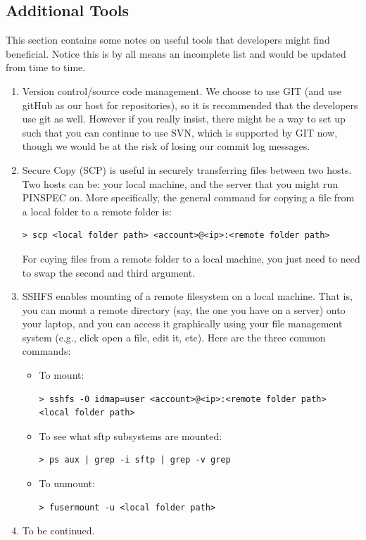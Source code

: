 \documentclass[titlepage]{article}
\begin{document}
\subsection{Additional Tools}
This section contains some notes on useful tools that developers might find beneficial. Notice this is by all means an incomplete list and would be updated from time to time. 
\begin{enumerate}
\item Version control/source code management. We choose to use GIT (and use gitHub as our host for repositories), so it is recommended that the developers use git as well. However if you really insist, there might be a way to set up such that you can continue to use SVN, which is supported by GIT now, though we would be at the risk of losing our commit log messages. 


\item Secure Copy (SCP) is useful in securely transferring files between two hosts. Two hosts can be: your local machine, and the server that you might run PINSPEC on. More specifically, the general command for copying a file from a local folder to a remote folder is: 
\begin{verbatim}
> scp <local folder path> <account>@<ip>:<remote folder path>
\end{verbatim}
For coying files from a remote folder to a local machine, you just need to need to swap the second and third argument. 

\item SSHFS enables mounting of a remote filesystem on a local machine. That is,  you can mount a remote directory (say, the one you have on a server) onto your laptop, and you can access it graphically using your file management system (e.g., click open a file, edit it, etc). Here are the three common commands:
\begin{itemize}
\item To mount: 
\begin{verbatim}
> sshfs -0 idmap=user <account>@<ip>:<remote folder path> <local folder path>
\end{verbatim}

\item To see what sftp subsystems are mounted: 
\begin{verbatim}
> ps aux | grep -i sftp | grep -v grep
\end{verbatim}

\item To unmount: 
\begin{verbatim}
> fusermount -u <local folder path>
\end{verbatim}
\end{itemize}

\item To be continued. 
\end{enumerate}
\end{document}
